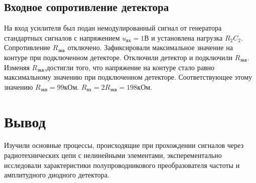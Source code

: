 \subsection{Входное сопротивление детектора}
На вход усилителя был подан немодулированный сигнал от генератора стандартных
сигналов с напряжением $u_{\text{вх}} = 1\text{В}$ и установлена нагрузка $R_2 C_2$. Сопротивление $R_{\text{экв}}$  отключено. Зафиксировали максимальное значение на контуре при подключенном детекторе. Отключили детектор и подключили $R_{\text{экв}}$. Изменяя $R_{\text{экв}}$,достигли того, что напряжение на контуре стало равно максимальному значению при подключенном детекторе. Соответствующее этому значению $R_{\text{экв}} =99 \text{кОм}$. $R_{\text{вх}} = 2R_{\text{экв}} = 198\text{кОм}$. 
\section{Вывод}
Изучили основные процессы, происходящие при прохождении сигналов через радиотехнических цепи с нелинейными элементами, эксперементально исследовали характеристики полупроводникового преобразователя частоты и амплитудного диодного детектора. 

